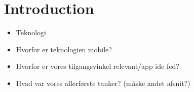 \documentclass[11pt]{article}
\begin{document}

\clearpage\maketitle
\thispagestyle{empty}

\newpage

\section{Introduction}
\begin{itemize}
\item Teknologi
\item Hvorfor er teknologien mobile?
\item Hvorfor er vores tilgangsvinkel relevant/app ide fed?
\item Hvad var vores allerførste tanker? (måske andet afsnit?)
\end{itemize}
\end{document}
